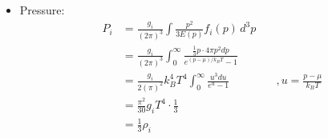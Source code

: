 \begin{foundation}
\begin{itemize}
\begin{align*}
        \end{align*}
        \item Pressure: 
        \begin{align*}
            P_i &= \frac{g_i}{(2\pi)^3} \int \frac{p^2}{3E(p)} f_i(p) \, d^3p \\
                &= \frac{g_i}{(2\pi)^3} \int_0^\infty \frac{\frac{1}{3} p \cdot 4 \pi p^2 dp}{e^{(p - \mu)/k_B T} - 1} \\
                &= \frac{g_i}{2(\pi)^2} k_B^4 T^4 \int_0^\infty \frac{u^3 du}{e^{u} - 1} & \quad , u = \frac{p - \mu}{k_B T} \\
                &= \frac{\pi^2}{30} g_i T^4 \cdot \frac{1}{3} & \\
                &= \frac{1}{3}\rho_i
        \end{align*}
    \end{itemize}


\end{foundation}
